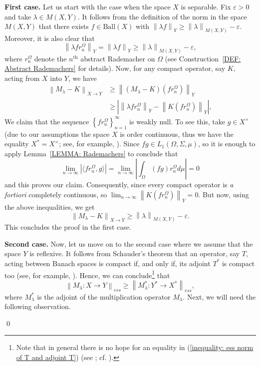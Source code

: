 \documentclass[11pt]{amsart}
\theoremstyle{definition}
\theoremstyle{definition}
\theoremstyle{definition}
\theoremstyle{definition}
\theoremstyle{definition}
\theoremstyle{definition}
\theoremstyle{definition}
\theoremstyle{definition}
\numberwithin{equation}{section}
\numberwithin{equation}{section}
\numberwithin{equation}{section}
\theoremstyle{definition}
\theoremstyle{definition}
\theoremstyle{definition}
\theoremstyle{definition}
\theoremstyle{definition}
\theoremstyle{definition}
\newcommand{\norm}[1]{\left\lVert#1\right\rVert}
\newcommand{\abs}[1]{\left\lvert#1\right\rvert}
\renewenvironment{proof}{\noindent {\bf Proof.}}{\qed}
\begin{document}
\begin{proof}
	{\bf First case.}
	Let us start with the case when the space $X$ is separable. Fix $\varepsilon > 0$ and take $\lambda \in M(X,Y)$. It follows from the definition
	of the norm in the space $M(X,Y)$ that there exists $f \in \text{Ball}(X)$ with $\norm{\lambda f}_Y \geqslant \norm{\lambda}_{M(X,Y)} - \varepsilon$.
	Moreover, it is also clear that
	\begin{equation*}
		\norm{\lambda f r^{\Omega}_n}_Y = \norm{\lambda f}_Y \geqslant \norm{\lambda}_{M(X,Y)} - \varepsilon,
	\end{equation*}
	where $r^{\Omega}_n$ denote the $n^{\text{th}}$ abstract Rademacher on $\Omega$ (see Construction~\ref{DEF: Abstract Rademachers} for details).
	Now, for any compact operator, say $K$, acting from $X$ into $Y$, we have
	\begin{align*}
		\norm{M_{\lambda} - K}_{X \rightarrow Y} 
			& \geqslant \norm{(M_{\lambda} - K)(f r^{\Omega}_n)}_Y \\
			& \geqslant \abs{\norm{\lambda f r^{\Omega}_n}_Y - \norm{K(f r^{\Omega}_n)}_Y},
	\end{align*}
	We claim that the sequence $\left\{ f r^{\Omega}_n \right\}_{n=1}^{\infty}$ is weakly null. To see this, take $g \in X^{\times}$
	(due to our assumptions the space $X$ is order continuous, thus we have the equality $X^* = X^{\times}$; see, for example,
	\cite[Theorem~4.1, p.~20]{BS88}). Since $fg \in L_1(\Omega,\Sigma,\mu)$, so it is enough to apply Lemma~\ref{LEMMA: Rademachers} to conclude that 
	\begin{equation*}
		\lim\limits_{n \rightarrow \infty} \abs{ \langle f r^{\Omega}_n, g \rangle } = \lim\limits_{n \rightarrow \infty} \abs{\int_{\Omega} (f g) r^{\Omega}_n d\mu} = 0
	\end{equation*}
	and this proves our claim. Consequently, since every compact operator is {\it a fortiori} completely continuous,
	so $\lim_{n \rightarrow \infty} \norm{K(f r^{\Omega}_n)}_Y = 0$. But now, using the above inequalities, we get
	\begin{equation*}
		\norm{M_{\lambda} - K}_{X \rightarrow Y} \geqslant \norm{\lambda}_{M(X,Y)} - \varepsilon.
	\end{equation*}
	This concludes the proof in the first case.
	
	{\bf Second case.}
	Now, let us move on to the second case where we assume that the space $Y$ is reflexive. It follows from Schauder's theorem that an operator, say $T$, acting
	between Banach spaces is compact if, and only if, its adjoint $T^*$ is compact too (see, for example, \cite[A.4, p.~329]{AK06}).
	Hence, we can conclude\footnote{Note that in general there is no hope for an equality in
	(\ref{inequality: ess norm of T and adjoint T}) (see \cite[Example~1]{AJS80}; cf. \cite[p.~160]{AJS80}).} that
	\begin{equation} \label{inequality: ess norm of T and adjoint T}
		\norm{M_{\lambda} \colon X \rightarrow Y}_{ess} \geqslant \norm{M_{\lambda}^* \colon Y^* \rightarrow X^*}_{ess},
	\end{equation}
	where $M_{\lambda}^*$ is the adjoint of the multiplication operator $M_{\lambda}$.
	Next, we will need the following observation.
	

\end{proof}
\end{document}
